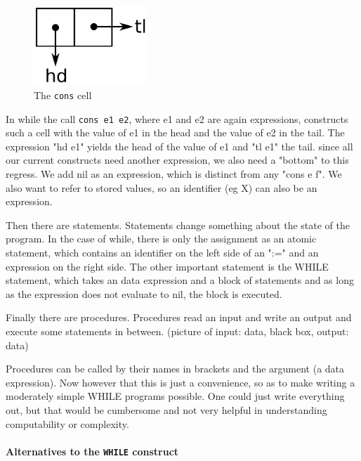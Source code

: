 \begin{figure}[htb]
	\begin{center}
		\includegraphics[height=3cm]{while/images/conscell}
	\end{center}
	\caption{The {\tt cons} cell}
\end{figure}

In while the call {\tt cons e1 e2}, where e1 and e2 are again
expressions, constructs such a cell with the value of e1 in the head and the
value of e2 in the tail. The expression "hd e1" yields the head of the value of
e1 and "tl e1" the tail. since all our current constructs need another
expression, we also need a "bottom" to this regress. We add nil as an
expression, which is distinct from any "cons e f". We also want to refer to
stored values, so an identifier (eg X) can also be an expression. 

Then there are statements. Statements change something about the state of the
program. In the case of while, there is only the assignment as an atomic
statement, which contains an identifier on the left side of an ":=" and an
expression on the right side. The other important statement is the WHILE
statement, which takes an data expression and a block of statements and as long
as the expression does not evaluate to nil, the block is executed. 

Finally there are procedures. Procedures read an input and write an output and
execute some statements in between. (picture of input: data, black box, output:
data)

Procedures can be called by their names in brackets and the argument (a data
expression). Now however that this is just a convenience, so as to make writing
a moderately simple WHILE programs possible. One could just write everything
out, but that would be cumbersome and not very helpful in understanding
computability or complexity.

\paragraph{Alternatives to the {\tt WHILE} construct} %
\label{par:Alternatives to the WHILE construct}
